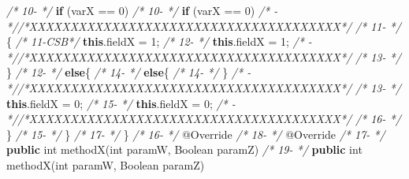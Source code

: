 \documentclass[
]{article}
\newenvironment{Shaded}{\begin{snugshade}}{\end{snugshade}}
\newcommand{\AttributeTok}[1]{\textcolor[rgb]{0.77,0.63,0.00}{#1}}
\newcommand{\BuiltInTok}[1]{#1}
\newcommand{\CommentTok}[1]{\textcolor[rgb]{0.56,0.35,0.01}{\textit{#1}}}
\newcommand{\DataTypeTok}[1]{\textcolor[rgb]{0.13,0.29,0.53}{#1}}
\newcommand{\DecValTok}[1]{\textcolor[rgb]{0.00,0.00,0.81}{#1}}
\newcommand{\FunctionTok}[1]{\textcolor[rgb]{0.00,0.00,0.00}{#1}}
\newcommand{\KeywordTok}[1]{\textcolor[rgb]{0.13,0.29,0.53}{\textbf{#1}}}
\newcommand{\NormalTok}[1]{#1}
\begin{document}
\begin{Shaded}
\begin{Highlighting}[]
\CommentTok{/* 10{-}   */}        \KeywordTok{if}\NormalTok{ (varX == }\DecValTok{0}\NormalTok{)                                   }\CommentTok{/* 10{-}   */}        \KeywordTok{if}\NormalTok{ (varX == }\DecValTok{0}\NormalTok{)                                   }
\CommentTok{/*   {-}   *//*XXXXXXXXXXXXXXXXXXXXXXXXXXXXXXXXXXXXXX*/}               \CommentTok{/* 11{-}   */}\NormalTok{        \{                                                }
\CommentTok{/* 11{-}CSB*/}            \KeywordTok{this}\NormalTok{.}\FunctionTok{fieldX}\NormalTok{ = }\DecValTok{1}\NormalTok{;                             }\CommentTok{/* 12{-}   */}            \KeywordTok{this}\NormalTok{.}\FunctionTok{fieldX}\NormalTok{ = }\DecValTok{1}\NormalTok{;                             }
\CommentTok{/*   {-}   *//*XXXXXXXXXXXXXXXXXXXXXXXXXXXXXXXXXXXXXX*/}               \CommentTok{/* 13{-}   */}\NormalTok{        \}                                                            }
\CommentTok{/* 12{-}   */}        \KeywordTok{else}\NormalTok{\{                                            }\CommentTok{/* 14{-}   */}        \KeywordTok{else}\NormalTok{\{                                            }
\CommentTok{/* 14{-}   */}\NormalTok{     \}                                                        }\CommentTok{/*   {-}   *//*XXXXXXXXXXXXXXXXXXXXXXXXXXXXXXXXXXXXXX*/}               
\CommentTok{/* 13{-}   */}            \KeywordTok{this}\NormalTok{.}\FunctionTok{fieldX}\NormalTok{ = }\DecValTok{0}\NormalTok{;                             }\CommentTok{/* 15{-}   */}            \KeywordTok{this}\NormalTok{.}\FunctionTok{fieldX}\NormalTok{ = }\DecValTok{0}\NormalTok{;                             }
\CommentTok{/*   {-}   *//*XXXXXXXXXXXXXXXXXXXXXXXXXXXXXXXXXXXXXX*/}               \CommentTok{/* 16{-}   */}\NormalTok{        \}                                                }
\CommentTok{/* 15{-}   */}\NormalTok{    \}                                                    }\CommentTok{/* 17{-}   */}\NormalTok{    \}                                                    }
\CommentTok{/* 16{-}   */}    \AttributeTok{@Override}                                            \CommentTok{/* 18{-}   */}    \AttributeTok{@Override}                                            
\CommentTok{/* 17{-}   */}    \KeywordTok{public} \DataTypeTok{int} \FunctionTok{methodX}\NormalTok{(}\DataTypeTok{int}\NormalTok{ paramW, }\BuiltInTok{Boolean}\NormalTok{ paramZ)       }\CommentTok{/* 19{-}   */}    \KeywordTok{public} \DataTypeTok{int} \FunctionTok{methodX}\NormalTok{(}\DataTypeTok{int}\NormalTok{ paramW, }\BuiltInTok{Boolean}\NormalTok{ paramZ)       }

\end{Highlighting}
\end{Shaded}
\end{document}
